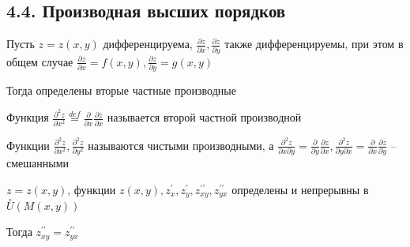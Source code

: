 \documentclass[12pt]{article}
\begin{document}
    \subsection{4.4. Производная высших порядков}

    \hypertarget{secondderivativeoffunctionoftwovariables}{}

    \Nota Пусть $\displaystyle z = z(x, y)$ дифференцируема, $\displaystyle \frac{\partial z}{\partial x}, \frac{\partial z}{\partial y}$ также дифференцируемы, при этом в общем случае
    $\displaystyle \frac{\partial z}{\partial x} = f(x, y), \frac{\partial z}{\partial y} = g(x, y)$

    Тогда определены вторые частные производные
    
    \Def Функция $\displaystyle \frac{\partial^2 z}{\partial x^2} \stackrel{def}{=} \frac{\partial}{\partial x} \frac{\partial z}{\partial x}$ называется второй частной производной

    Функции $\displaystyle \frac{\partial^2 z}{\partial x^2}, \frac{\partial^2 z}{\partial y^2}$ называются чистыми производными, а $\displaystyle \frac{\partial^2 z}{\partial x \partial y} = \frac{\partial}{\partial y} \frac{\partial z}{\partial x}, \displaystyle \frac{\partial^2 z}{\partial y \partial x} = \frac{\partial}{\partial x} \frac{\partial z}{\partial y}$ -- смешанными

    \hypertarget{equalityofsecondderivativesoffunctionoftwovariables}{}

    \begin{MyTheorem}
        \Ths $\displaystyle z = z(x, y)$, функции $\displaystyle z(x, y), z^\prime_x, z^\prime_y, z^{\prime\prime}_{xy}, z^{\prime\prime}_{yx}$ определены и непрерывны в $\displaystyle \overset{\circ}{U}(M(x, y))$

        Тогда $\displaystyle z^{\prime\prime}_{xy} = z^{\prime\prime}_{yx}$
    \end{MyTheorem}
\end{document}
